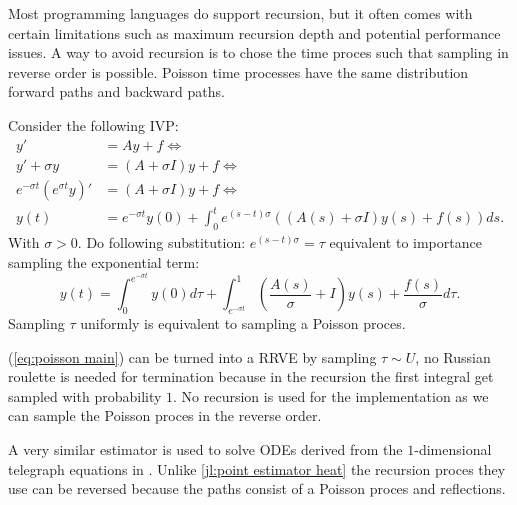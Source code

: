 \documentclass[a4paper,12pt]{article}
\begin{document}
Most programming languages do support recursion, but it often comes with certain
limitations such as maximum recursion depth and potential performance issues.
A way to avoid recursion is to chose the time proces such that sampling in reverse order is possible.
Poisson time processes have the same distribution forward paths and backward paths.

\begin{definition} \label{def:main poisson}
  Consider the following IVP:
  \begin{align}
    y'                              & = A y + f \Leftrightarrow                                                                             \\
    y'+\sigma y                     & = (A + \sigma I) y + f\Leftrightarrow                                                                 \\
    e^{-\sigma t} ( e^{\sigma t}y)' & = (A + \sigma I) y + f  \Leftrightarrow                                                               \\
    y(t)                            & = e^{-\sigma t} y(0) + \int_{0}^{t} e^{(s-t) \sigma} \left(  (A(s) + \sigma I ) y(s) +f(s)\right) ds.
  \end{align}
  With $\sigma>0$. Do following substitution: $e^{(s-t)\sigma} = \tau$ equivalent to importance sampling
  the exponential term:
  \begin{equation} \label{eq:poisson main}
    y(t) = \int_{0}^{e^{-\sigma t}}  y(0) d\tau + \int_{e^{-\sigma t}}^{1} \left(  \frac{A(s)}{\sigma} + I\right)  y(s) + \frac{f(s)}{\sigma} d\tau
    .
  \end{equation}
  Sampling $\tau$ uniformly is equivalent to sampling a Poisson proces.
\end{definition}

\begin{julia}
  (\ref{eq:poisson main}) can be turned into a RRVE by sampling $\tau \sim U$, no Russian roulette is needed for
  termination because in the recursion the first integral get sampled with probability $1$. No recursion is used
  for the implementation as we can sample the Poisson proces in the reverse order.

\end{julia}

\begin{related}
  A very similar estimator is used to solve ODEs derived from the
  $1$-dimensional telegraph equations in \cite{acebron_monte_2016}.
  Unlike \ref{jl:point estimator heat} the recursion proces they use can be reversed
  because the paths consist of a Poisson proces and reflections.
\end{related}
\end{document}
